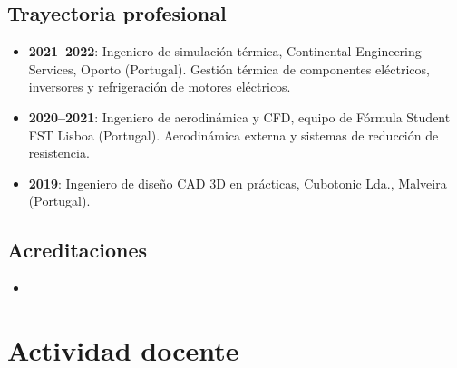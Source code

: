 \documentclass[11pt]{article}
\begin{document}
\subsection{Trayectoria profesional}
\begin{itemize}
  \item \textbf{2021--2022}: Ingeniero de simulaci\'on t\'ermica, Continental Engineering
  Services, Oporto (Portugal). Gesti\'on t\'ermica de componentes el\'ectricos,
  inversores y refrigeraci\'on de motores el\'ectricos. 
  \item \textbf{2020--2021}: Ingeniero de aerodin\'amica y CFD, equipo de F\'ormula Student
  FST Lisboa (Portugal). Aerodin\'amica externa y sistemas de reducci\'on de resistencia.
  \item \textbf{2019}: Ingeniero de dise\~no CAD 3D en pr\'acticas, Cubotonic Lda.,
  Malveira (Portugal).
\end{itemize}

\subsection{Acreditaciones}
\begin{itemize}
  \item {}
\end{itemize}

\section{Actividad docente}
\end{document}
